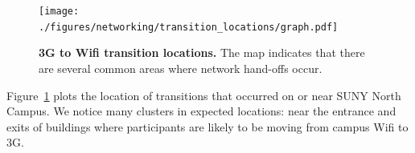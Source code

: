 \begin{figure}[t]

\centering
\texttt{[image: ./figures/networking/transition\_locations/graph.pdf]}

\caption{\textbf{3G to Wifi transition locations.} The map indicates that
there are several common areas where network hand-offs occur.}

\label{figure-networktransitions}

\vspace*{-0.15in}

\end{figure}

Figure~\ref{figure-networktransitions} plots the location of transitions that
occurred on or near SUNY North Campus. We notice many clusters in expected
locations: near the entrance and exits of buildings where participants are
likely to be moving from campus Wifi to 3G.
